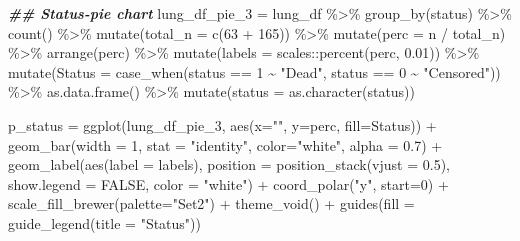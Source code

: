 \documentclass[
]{article}
\newenvironment{Shaded}{\begin{snugshade}}{\end{snugshade}}
\newcommand{\AttributeTok}[1]{\textcolor[rgb]{0.77,0.63,0.00}{#1}}
\newcommand{\ConstantTok}[1]{\textcolor[rgb]{0.00,0.00,0.00}{#1}}
\newcommand{\DecValTok}[1]{\textcolor[rgb]{0.00,0.00,0.81}{#1}}
\newcommand{\DocumentationTok}[1]{\textcolor[rgb]{0.56,0.35,0.01}{\textbf{\textit{#1}}}}
\newcommand{\FloatTok}[1]{\textcolor[rgb]{0.00,0.00,0.81}{#1}}
\newcommand{\FunctionTok}[1]{\textcolor[rgb]{0.00,0.00,0.00}{#1}}
\newcommand{\NormalTok}[1]{#1}
\newcommand{\OtherTok}[1]{\textcolor[rgb]{0.56,0.35,0.01}{#1}}
\newcommand{\SpecialCharTok}[1]{\textcolor[rgb]{0.00,0.00,0.00}{#1}}
\newcommand{\StringTok}[1]{\textcolor[rgb]{0.31,0.60,0.02}{#1}}
\begin{document}
\begin{Shaded}
\begin{Highlighting}[]
\DocumentationTok{\#\# Status{-}pie chart}
\NormalTok{lung\_df\_pie\_3 }\OtherTok{=}\NormalTok{ lung\_df }\SpecialCharTok{\%\textgreater{}\%}
  \FunctionTok{group\_by}\NormalTok{(status) }\SpecialCharTok{\%\textgreater{}\%} 
  \FunctionTok{count}\NormalTok{() }\SpecialCharTok{\%\textgreater{}\%} 
  \FunctionTok{mutate}\NormalTok{(}\AttributeTok{total\_n =} \FunctionTok{c}\NormalTok{(}\DecValTok{63} \SpecialCharTok{+} \DecValTok{165}\NormalTok{)) }\SpecialCharTok{\%\textgreater{}\%} 
  \FunctionTok{mutate}\NormalTok{(}\AttributeTok{perc =} \StringTok{\textasciigrave{}}\AttributeTok{n}\StringTok{\textasciigrave{}} \SpecialCharTok{/} \StringTok{\textasciigrave{}}\AttributeTok{total\_n}\StringTok{\textasciigrave{}}\NormalTok{) }\SpecialCharTok{\%\textgreater{}\%} 
  \FunctionTok{arrange}\NormalTok{(perc) }\SpecialCharTok{\%\textgreater{}\%}
  \FunctionTok{mutate}\NormalTok{(}\AttributeTok{labels =}\NormalTok{ scales}\SpecialCharTok{::}\FunctionTok{percent}\NormalTok{(perc, }\FloatTok{0.01}\NormalTok{)) }\SpecialCharTok{\%\textgreater{}\%}
  \FunctionTok{mutate}\NormalTok{(}\AttributeTok{Status =} \FunctionTok{case\_when}\NormalTok{(status }\SpecialCharTok{==} \DecValTok{1} \SpecialCharTok{\textasciitilde{}} \StringTok{"Dead"}\NormalTok{,}
\NormalTok{                         status }\SpecialCharTok{==} \DecValTok{0} \SpecialCharTok{\textasciitilde{}} \StringTok{"Censored"}\NormalTok{)) }\SpecialCharTok{\%\textgreater{}\%}
  \FunctionTok{as.data.frame}\NormalTok{() }\SpecialCharTok{\%\textgreater{}\%}
  \FunctionTok{mutate}\NormalTok{(}\AttributeTok{status =} \FunctionTok{as.character}\NormalTok{(status)) }
  
\NormalTok{p\_status }\OtherTok{=} 
  \FunctionTok{ggplot}\NormalTok{(lung\_df\_pie\_3, }\FunctionTok{aes}\NormalTok{(}\AttributeTok{x=}\StringTok{""}\NormalTok{, }\AttributeTok{y=}\NormalTok{perc, }\AttributeTok{fill=}\NormalTok{Status)) }\SpecialCharTok{+} 
  \FunctionTok{geom\_bar}\NormalTok{(}\AttributeTok{width =} \DecValTok{1}\NormalTok{, }\AttributeTok{stat =} \StringTok{"identity"}\NormalTok{, }\AttributeTok{color=}\StringTok{"white"}\NormalTok{, }\AttributeTok{alpha =} \FloatTok{0.7}\NormalTok{) }\SpecialCharTok{+} 
  \FunctionTok{geom\_label}\NormalTok{(}\FunctionTok{aes}\NormalTok{(}\AttributeTok{label =}\NormalTok{ labels),}
             \AttributeTok{position =} \FunctionTok{position\_stack}\NormalTok{(}\AttributeTok{vjust =} \FloatTok{0.5}\NormalTok{),}
             \AttributeTok{show.legend =} \ConstantTok{FALSE}\NormalTok{,}
             \AttributeTok{color =} \StringTok{"white"}\NormalTok{) }\SpecialCharTok{+}
  \FunctionTok{coord\_polar}\NormalTok{(}\StringTok{"y"}\NormalTok{, }\AttributeTok{start=}\DecValTok{0}\NormalTok{) }\SpecialCharTok{+}
  \FunctionTok{scale\_fill\_brewer}\NormalTok{(}\AttributeTok{palette=}\StringTok{"Set2"}\NormalTok{) }\SpecialCharTok{+}
  \FunctionTok{theme\_void}\NormalTok{() }\SpecialCharTok{+}
  \FunctionTok{guides}\NormalTok{(}\AttributeTok{fill =} \FunctionTok{guide\_legend}\NormalTok{(}\AttributeTok{title =} \StringTok{"Status"}\NormalTok{))}


\end{Highlighting}
\end{Shaded}
\end{document}
